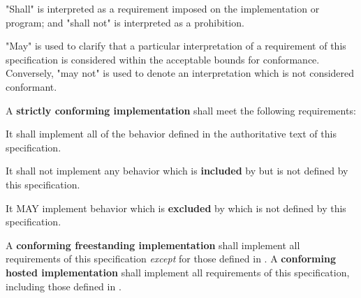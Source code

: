 
\specitem
"Shall" is interpreted as a requirement imposed on the implementation or
program; and "shall not" is interpreted as a prohibition.

\specitem
"May" is used to clarify that a particular interpretation of a requirement of
this specification is considered within the acceptable bounds for conformance.
Conversely, "may not" is used to denote an interpretation which is not
considered conformant.

\specitem
A \textbf{strictly conforming implementation} shall meet the following
requirements:

\specsubitem
It shall implement all of the behavior defined in the authoritative text of this
\\ specification.

\specsubitem
It shall not implement any behavior which is \textbf{included} by
 but is not defined by this specification.


\specsubitem
It MAY implement behavior which is \textbf{excluded} by 
which is not defined by this specification.

\specitem
A \textbf{conforming freestanding implementation} shall implement all
requirements of this specification \textit{except} for those defined in
. A \textbf{conforming hosted implementation} shall
implement all requirements of this specification, including those defined in
.

